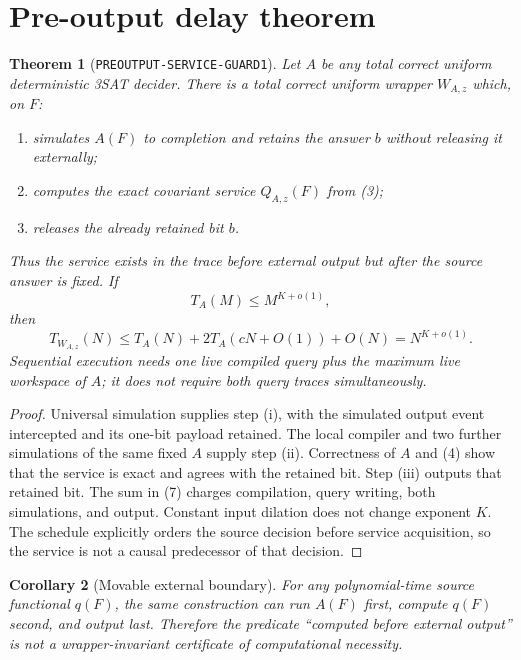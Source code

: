 \documentclass[11pt]{article}
\newtheorem{theorem}{Theorem}
\newtheorem{corollary}[theorem]{Corollary}
\begin{document}
\section{Pre-output delay theorem}

\begin{theorem}[\texttt{PREOUTPUT-SERVICE-GUARD1}]
Let $A$ be any total correct uniform deterministic 3SAT decider.  There is a
total correct uniform wrapper $W_{A,z}$ which, on $F$:
\begin{enumerate}[label=(\roman*)]
\item simulates $A(F)$ to completion and retains the answer $b$ without
releasing it externally;
\item computes the exact covariant service $Q_{A,z}(F)$ from (3);
\item releases the already retained bit $b$.
\end{enumerate}
Thus the service exists in the trace before external output but after the
source answer is fixed.  If
\[
 T_A(M)\le M^{K+o(1)},
\]
then
\[
 T_{W_{A,z}}(N)
 \le T_A(N)+2T_A(cN+O(1))+O(N)
 =N^{K+o(1)}.                                             \tag{7}
\]
Sequential execution needs one live compiled query plus the maximum live
workspace of $A$; it does not require both query traces simultaneously.
\end{theorem}

\begin{proof}
Universal simulation supplies step (i), with the simulated output event
intercepted and its one-bit payload retained.  The local compiler and two
further simulations of the same fixed $A$ supply step (ii).  Correctness of
$A$ and (4) show that the service is exact and agrees with the retained bit.
Step (iii) outputs that retained bit.  The sum in (7) charges compilation,
query writing, both simulations, and output.  Constant input dilation does
not change exponent $K$.  The schedule explicitly orders the source decision
before service acquisition, so the service is not a causal predecessor of
that decision.
\end{proof}

\begin{corollary}[Movable external boundary]
For any polynomial-time source functional $q(F)$, the same construction can
run $A(F)$ first, compute $q(F)$ second, and output last.  Therefore the
predicate ``computed before external output'' is not a wrapper-invariant
certificate of computational necessity.
\end{corollary}
\end{document}
